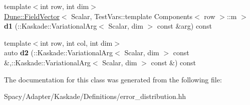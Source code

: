 \begin{DoxyCompactItemize}
\item 
\hypertarget{classSpacy_1_1Kaskade_1_1ErrorDistribution_1_1DomainCache_a392dcc0c91960b8c11ffe34e9ffd4a2b}{}{\footnotesize template$<$int row, int dim$>$ }\\\hyperlink{classDune_1_1FieldVector}{Dune\+::\+Field\+Vector}$<$ Scalar, Test\+Vars\+::template Components$<$ row $>$\+::m $>$ {\bfseries d1} (\+::Kaskade\+::\+Variational\+Arg$<$ Scalar, dim $>$ const \&arg) const \label{classSpacy_1_1Kaskade_1_1ErrorDistribution_1_1DomainCache_a392dcc0c91960b8c11ffe34e9ffd4a2b}

\item 
\hypertarget{classSpacy_1_1Kaskade_1_1ErrorDistribution_1_1DomainCache_af8c82b3c6c53e77556c1f208388a2074}{}{\footnotesize template$<$int row, int col, int dim$>$ }\\auto {\bfseries d2} (\+::Kaskade\+::\+Variational\+Arg$<$ Scalar, dim $>$ const \&,\+::Kaskade\+::\+Variational\+Arg$<$ Scalar, dim $>$ const \&) const \label{classSpacy_1_1Kaskade_1_1ErrorDistribution_1_1DomainCache_af8c82b3c6c53e77556c1f208388a2074}

\end{DoxyCompactItemize}


The documentation for this class was generated from the following file\+:\begin{DoxyCompactItemize}
\item 
Spacy/\+Adapter/\+Kaskade/\+Definitions/error\+\_\+distribution.\+hh\end{DoxyCompactItemize}
